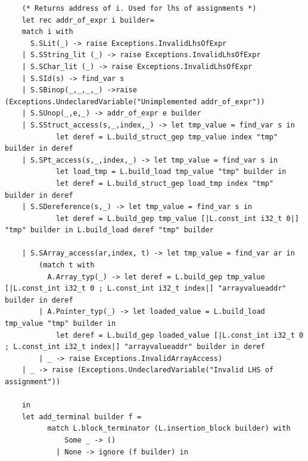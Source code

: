 \documentclass{article}
\begin{document}
\begin{lstlisting}
	(* Returns address of i. Used for lhs of assignments *)
	let rec addr_of_expr i builder= 
	match i with
	  S.SLit(_) -> raise Exceptions.InvalidLhsOfExpr
	| S.SString_lit (_) -> raise Exceptions.InvalidLhsOfExpr
	| S.SChar_lit (_) -> raise Exceptions.InvalidLhsOfExpr
 	| S.SId(s) -> find_var s
	| S.SBinop(_,_,_,_) ->raise (Exceptions.UndeclaredVariable("Unimplemented addr_of_expr"))
 	| S.SUnop(_,e,_) -> addr_of_expr e builder
	| S.SStruct_access(s,_,index,_) -> let tmp_value = find_var s in 
			let deref = L.build_struct_gep tmp_value index "tmp" builder in deref
	| S.SPt_access(s,_,index,_) -> let tmp_value = find_var s in 
			let load_tmp = L.build_load tmp_value "tmp" builder in 
			let deref = L.build_struct_gep load_tmp index "tmp" builder in deref
	| S.SDereference(s,_) -> let tmp_value = find_var s in 
			let deref = L.build_gep tmp_value [|L.const_int i32_t 0|] "tmp" builder in L.build_load deref "tmp" builder

	| S.SArray_access(ar,index, t) -> let tmp_value = find_var ar in 
		(match t with 
		  A.Array_typ(_) -> let deref = L.build_gep tmp_value [|L.const_int i32_t 0 ; L.const_int i32_t index|] "arrayvalueaddr" builder in deref 
		| A.Pointer_typ(_) -> let loaded_value = L.build_load tmp_value "tmp" builder in 
			let deref = L.build_gep loaded_value [|L.const_int i32_t 0 ; L.const_int i32_t index|] "arrayvalueaddr" builder in deref 
		| _ -> raise Exceptions.InvalidArrayAccess)
	| _ -> raise (Exceptions.UndeclaredVariable("Invalid LHS of assignment"))

	in 
	let add_terminal builder f =
          match L.block_terminator (L.insertion_block builder) with
        	  Some _ -> ()
      		| None -> ignore (f builder) in	


\end{lstlisting}
\end{document}
